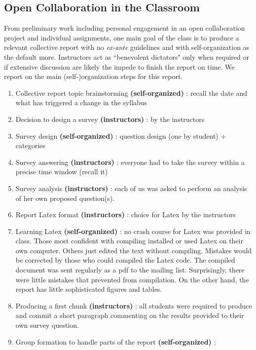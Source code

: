 \subsection{Open Collaboration in the Classroom}
\label{opencollaborationintheclassroom}

From preliminary work including personal engagement in an open collaboration project and individual assignments, one main goal of the class is to produce a relevant collective report with no {\it ex-ante} guidelines and with self-organization as the default more. Instructors act as ``benevolent dictators" only when required or if extensive discussion are likely the impede to finish the report on time. We report on the main (self-)organization steps for this report.

\begin{enumerate}
  \item Collective report topic brainstorming {\bf (self-organized)} : recall the date and what has triggered a change in the syllabus
  \item Decision to design a survey {\bf (instructors)} : by the instructors
  \item Survey design {\bf (self-organized)} : question design (one by student) + categories
  \item Survey answering {\bf (instructors)} : everyone had to take the survey within a precise time window (recall it)
  \item Survey analysis {\bf (instructors)} :  each of us was asked to perform an analysis of her own proposed question(s).
  \item Report Latex format {\bf (instructors)} : choice for Latex by the instructors
  \item Learning Latex {\bf (self-organized)} : no crash course for Latex was provided in class. Those most confident with compiling installed or used Latex on their own computer. Others just edited the text without compiling. Mistakes would be corrected by those who could compiled the Latex code. The compiled document was sent regularly as a pdf to the mailing list. Surprisingly, there were little mistakes that prevented from compilation. On the other hand, the report has little sophisticated figures and tables.
  \item Producing a first chunk {\bf (instructors)} : all students were required to produce and commit a short paragraph commenting on the results provided to their own survey question.  
  \item Group formation to handle parts of the report {\bf (self-organized)} : 

\end{enumerate}

